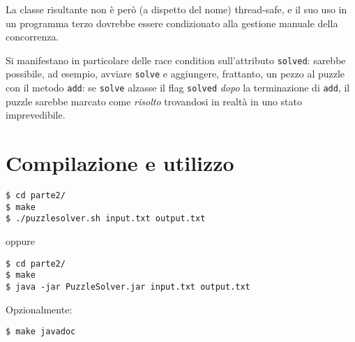 \documentclass[a4paper]{article}
\newcommand{\Methodname}[1]{\texttt{#1}}
\begin{document}
La classe risultante non \`e per\`o (a dispetto del nome) thread-safe, e il suo uso in un programma terzo dovrebbe essere condizionato alla gestione manuale della concorrenza.

Si manifestano in particolare delle race condition sull'attributo \Methodname{solved}: sarebbe possibile, ad esempio, avviare \Methodname{solve} e aggiungere, frattanto, un pezzo al puzzle con il metodo \Methodname{add}: se \Methodname{solve} alzasse il flag \Methodname{solved} \emph{dopo} la terminazione di \Methodname{add}, il puzzle sarebbe marcato come \emph{risolto} trovandosi in realt\`a in uno stato imprevedibile.



\section{Compilazione e utilizzo}
\begin{verbatim}
$ cd parte2/ 
$ make
$ ./puzzlesolver.sh input.txt output.txt
\end{verbatim}
oppure
\begin{verbatim}
$ cd parte2/ 
$ make
$ java -jar PuzzleSolver.jar input.txt output.txt
\end{verbatim}

Opzionalmente:
\begin{verbatim}
$ make javadoc
\end{verbatim}


{}

\end{document}

